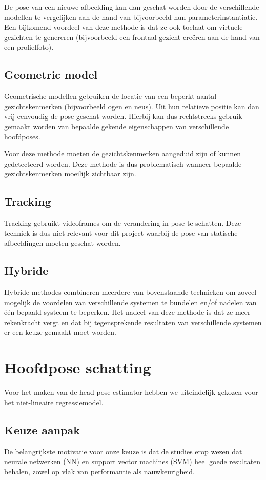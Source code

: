 \documentclass[a4paper,dutch,11pt]{scrartcl}
\begin{document}
De pose van een nieuwe afbeelding kan dan geschat worden door de verschillende modellen te vergelijken aan de hand van bijvoorbeeld hun parameterinstantiatie. Een bijkomend voordeel van deze methode is dat ze ook toelaat om virtuele gezichten te genereren (bijvoorbeeld een frontaal gezicht cre\"eren aan de hand van een profielfoto).

\subsection{Geometric model}
Geometrische modellen gebruiken de locatie van een beperkt aantal gezichtskenmerken (bijvoorbeeld ogen en neus). Uit hun relatieve positie kan dan vrij eenvoudig de pose geschat worden. Hierbij kan dus rechtstreeks gebruik gemaakt worden van bepaalde gekende eigenschappen van verschillende hoofdposes.

Voor deze methode moeten de gezichtskenmerken aangeduid zijn of kunnen gedetecteerd worden. Deze methode is dus problematisch wanneer bepaalde gezichtskenmerken moeilijk zichtbaar zijn.

\subsection{Tracking}
Tracking gebruikt videoframes om de verandering in pose te schatten. Deze techniek is dus niet relevant voor dit project waarbij de pose van statische afbeeldingen moeten geschat worden. %

\subsection{Hybride}
Hybride methodes combineren meerdere van bovenstaande technieken om zoveel mogelijk de voordelen van verschillende systemen te bundelen en/of nadelen van \'e\'en bepaald systeem te beperken. Het nadeel van deze methode is dat ze meer rekenkracht vergt en dat bij tegensprekende resultaten van verschillende systemen er een keuze gemaakt moet worden.

\section{Hoofdpose schatting}
Voor het maken van de head pose estimator hebben we uiteindelijk gekozen voor het niet-lineaire regressiemodel.
\subsection{Keuze aanpak}
De belangrijkste motivatie voor onze keuze is dat de studies erop wezen dat neurale netwerken (NN) en support vector machines (SVM) heel goede resultaten behalen, zowel op vlak van performantie als nauwkeurigheid. 
\end{document}
